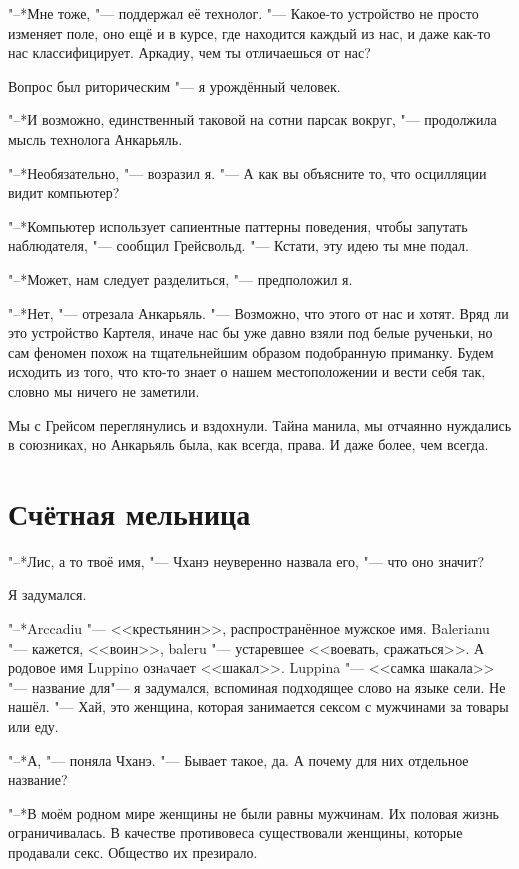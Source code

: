 \documentclass[a4paper,10pt,fleqn]{book}
\newcommand{\ldotst}{\so{...}\xspace}
\begin{document}
"--*Мне тоже, "--- поддержал её технолог.
"--- Какое-то устройство не просто изменяет поле, оно ещё и в курсе, где находится каждый из нас, и даже как-то нас классифицирует.
Аркадиу, чем ты отличаешься от нас?

Вопрос был риторическим "--- я урождённый человек.

"--*И возможно, единственный таковой на сотни парсак вокруг, "--- продолжила мысль технолога Анкарьяль.

"--*Необязательно, "--- возразил я.
"--- А как вы объясните то, что осцилляции видит компьютер?

"--*Компьютер использует сапиентные паттерны поведения, чтобы запутать наблюдателя, "--- сообщил Грейсвольд.
"--- Кстати, эту идею ты мне подал.

"--*Может, нам следует разделиться, "--- предположил я.

"--*Нет, "--- отрезала Анкарьяль.
"--- Возможно, что этого от нас и хотят.
Вряд ли это устройство Картеля, иначе нас бы уже давно взяли под белые рученьки, но сам феномен похож на тщательнейшим образом подобранную приманку.
Будем исходить из того, что кто-то знает о нашем местоположении\ldotst и вести себя так, словно мы ничего не заметили.

Мы с Грейсом переглянулись и вздохнули.
Тайна манила, мы отчаянно нуждались в союзниках, но Анкарьяль была, как всегда, права.
И даже более, чем всегда.

\section{Счётная мельница}

"--*Лис, а то твоё имя, "--- Чханэ неуверенно назвала его, "--- что оно значит?

Я задумался.

"--*Arccadiu "--- <<крестьянин>>, распространённое мужское имя.
Balerianu "--- кажется, <<воин>>, baleru "--- устаревшее <<воевать, сражаться>>.
А родовое имя Luppino ознaчает <<шакал>>.
Luppina "--- <<самка шакала>> "--- название для\ldotst "--- я задумался, вспоминая подходящее слово на языке сели.
Не нашёл.
"--- Хай, это женщина, которая занимается сексом с мужчинами за товары или еду.

"--*А, "--- поняла Чханэ.
"--- Бывает такое, да.
А почему для них отдельное название?

"--*В моём родном мире женщины не были равны мужчинам.
Их половая жизнь ограничивалась.
В качестве противовеса существовали женщины, которые продавали секс.
Общество их презирало.
\end{document}
